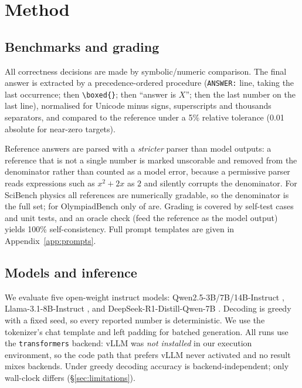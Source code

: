 \documentclass[10pt,letterpaper]{article}
\begin{document}
\section{Method}
\label{sec:method}

\subsection{Benchmarks and grading}
All correctness decisions are made by symbolic/numeric comparison. The final
answer is extracted by a precedence-ordered procedure (\texttt{ANSWER:} line,
taking the last occurrence; then \texttt{\textbackslash boxed\{\}}; then
``answer is $X$''; then the last number on the last line), normalised for Unicode
minus signs, superscripts and thousands separators, and compared to the reference
under a 5\% relative tolerance (0.01 absolute for near-zero targets).

Reference answers are parsed with a \emph{stricter} parser than model outputs: a
reference that is not a single number is marked unscorable and removed from the
denominator rather than counted as a model error, because a permissive parser
reads expressions such as $x^2+2x$ as $2$ and silently corrupts the denominator.
For SciBench physics all \nbSciBench{} references are numerically gradable, so the
denominator is the full set; for OlympiadBench only \nbOlympiadScorable{} of
\nbOlympiadAll{} are. Grading is covered by \nbSelfCheck{} self-test cases and
\nbTests{} unit tests, and an oracle check (feed the reference as the model
output) yields 100\% self-consistency. Full prompt templates are given in
Appendix~\ref{app:prompts}.

\subsection{Models and inference}
We evaluate five open-weight instruct models: Qwen2.5-3B/7B/14B-Instruct
\citep{qwen2024}, Llama-3.1-8B-Instruct \citep{grattafiori2024llama3}, and
DeepSeek-R1-Distill-Qwen-7B \citep{guo2025deepseekr1}. Decoding is greedy with a
fixed seed, so every reported number is deterministic. We use the tokenizer's chat
template and left padding for batched generation. All runs use the
\texttt{transformers} backend: vLLM was \emph{not installed} in our execution
environment, so the code path that prefers vLLM never activated and no result
mixes backends. Under greedy decoding accuracy is backend-independent; only
wall-clock differs (\S\ref{sec:limitations}).
\end{document}
